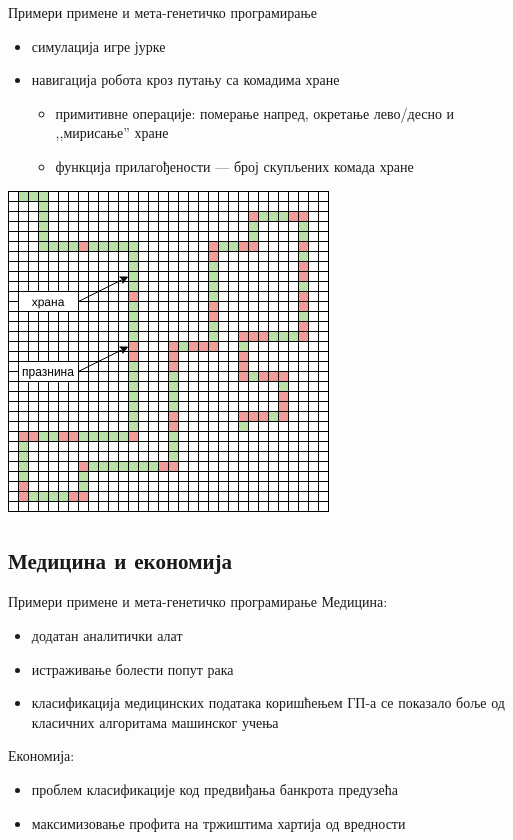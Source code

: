 \documentclass{beamer}
\begin{document}
\begin{frame}{Примери примене и мета-генетичко програмирање}
    \begin{minipage}{0.6\textwidth}
        \begin{itemize}
            \item симулација игре јурке
            \item навигација робота кроз путању са комадима хране
            \begin{itemize}
                \item примитивне операције: померање напред, окретање лево/десно и ,,мирисање'' хране
                \item функција прилагођености — број скупљених комада хране
            \end{itemize}
        \end{itemize}
    \end{minipage}
    \begin{minipage}{0.35\textwidth}\raggedleft
        \includegraphics[scale=0.30]{santa_fe.png}
    \end{minipage}
\end{frame}

\subsection[Медицина и економија]{Медицина и економија}

\begin{frame}{Примери примене и мета-генетичко програмирање}
    Медицина:
    \begin{itemize}
        \item додатан аналитички алат
        \item истраживање болести попут рака
        \item класификација медицинских података коришћењем ГП-а се показало боље од класичних алгоритама машинског учења
    \end{itemize}
    Економија:
    \begin{itemize}
        \item проблем класификације код предвиђања банкрота предузећа
        \item максимизовање профита на тржиштима хартија од вредности
    \end{itemize}
\end{frame}
\end{document}
